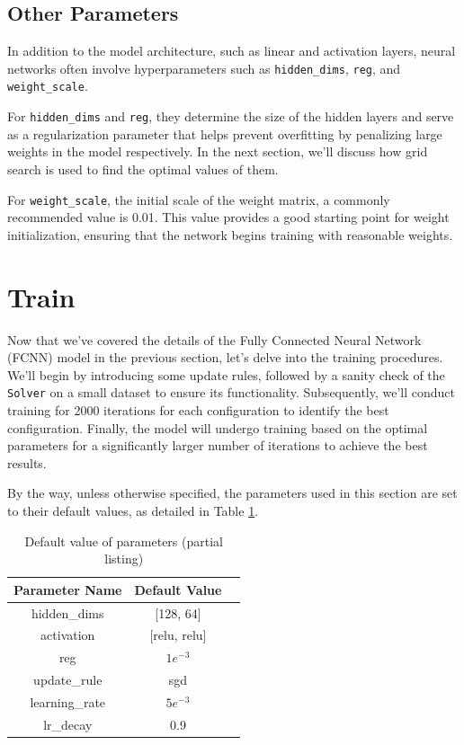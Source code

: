 \documentclass[10pt,a4paper,twoside]{tau}
\begin{document}
\subsection{Other Parameters}

In addition to the model architecture, such as linear and activation layers, neural networks often involve hyperparameters such as \texttt{hidden\_dims}, \texttt{reg}, and \texttt{weight\_scale}. 

For \texttt{hidden\_dims} and \texttt{reg}, they determine the size of the hidden layers and serve as a regularization parameter that helps prevent overfitting by penalizing large weights in the model respectively. In the next section, we'll discuss how grid search is used to find the optimal values of them.

For \texttt{weight\_scale}, the initial scale of the weight matrix, a commonly recommended value is 0.01. This value provides a good starting point for weight initialization, ensuring that the network begins training with reasonable weights.



\section{Train}

Now that we've covered the details of the Fully Connected Neural Network (FCNN) model in the previous section, let's delve into the training procedures. We'll begin by introducing some update rules, followed by a sanity check of the \texttt{Solver} on a small dataset to ensure its functionality. Subsequently, we'll conduct training for 2000 iterations for each configuration to identify the best configuration. Finally, the model will undergo training based on the optimal parameters for a significantly larger number of iterations to achieve the best results.

By the way, unless otherwise specified, the parameters used in this section are set to their default values, as detailed in Table \ref{tab:parameters}.


\begin{table}[htbp]
    \centering
    \begin{tabular}{|c|c|c|}
        \hline
        \textbf{Parameter Name} & \textbf{Default Value} \\
        \hline
        hidden\_dims & [128, 64]  \\
        \hline
        activation & [relu, relu] \\
        \hline
        reg & $1e^{-3}$ \\
        \hline
        update\_rule & sgd \\
        \hline
        learning\_rate & $5e^{-3}$ \\
        \hline
        lr\_decay & 0.9 \\
        \hline
    \end{tabular}
    \caption{Default value of parameters (partial listing)}
    \label{tab:parameters}
\end{table}
\end{document}
